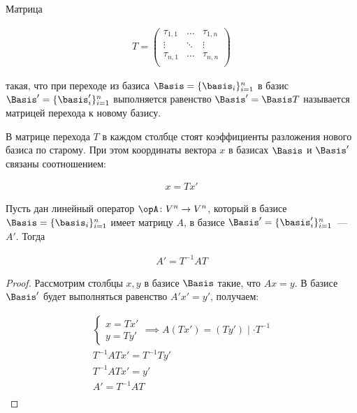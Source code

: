 \begin{definition}
  Матрица 

  \begin{align*}
    T =
    \begin{pmatrix}
      \tau_{1,1} & \dots & \tau_{1,n} \\
      \vdots & \ddots & \vdots \\
      \tau_{n,1} & \dots & \tau_{n,n} \\
    \end{pmatrix}
  \end{align*}

  такая, что при переходе из базиса \(\Basis = \{ \basis_{i} \}_{i = 1}^{n}\)
  в базис \(\Basis' = \{ \basis_{i}' \}_{i = 1}^{n}\) выполняется равенство
  \(\Basis' = \Basis T\) называется матрицей перехода к новому базису.
\end{definition}

\begin{remark}
  В матрице перехода \(T\) в каждом столбце стоят коэффициенты разложения нового
  базиса по старому. При этом координаты вектора \(x\) в базисах \(\Basis\) и
  \(\Basis'\) связаны соотношением:

  \begin{align*}
    x = T x'
  \end{align*}
\end{remark}

\begin{theorem}
  Пусть дан линейный оператор \(\opA \colon V^{n} \to V^{n}\), который в базисе
  \(\Basis = \{ \basis_{i} \}_{i = 1}^{n}\) имеет матрицу \(A\), в базисе
  \(\Basis' = \{ \basis_{i}' \}_{i = 1}^{n}\)~---\(A'\).
  Тогда

  \begin{align*}
    A' = T^{-1} A T
  \end{align*}
\end{theorem}
\begin{proof}
  Рассмотрим столбцы \(x, y\) в базисе \(\Basis\) такие, что \(A x = y\). В
  базисе \(\Basis'\) будет выполняться равенство \(A' x' = y'\), получаем:

  \begin{align*}
    \begin{cases}
      x = T x' \\
      y = T y'
    \end{cases}
    \implies A (T x') = (T y') \mid \cdot T^{-1} \\
    T^{-1} A T x' = T^{-1} T y' \\
    T^{-1} A T x' = y' \\
    A' = T^{-1} A T \\
  \end{align*}
\end{proof}

